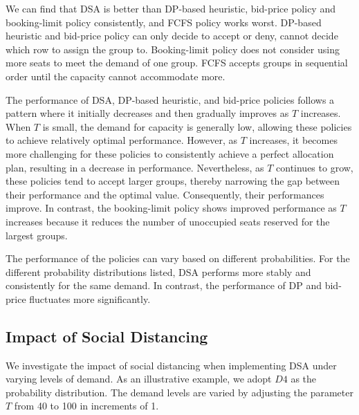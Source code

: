 We can find that DSA is better than DP-based heuristic, bid-price policy and booking-limit policy consistently, and FCFS policy works worst. DP-based heuristic and bid-price policy can only decide to accept or deny, cannot decide which row to assign the group to. Booking-limit policy does not consider using more seats to meet the demand of one group. FCFS accepts groups in sequential order until the capacity cannot accommodate more.

The performance of DSA, DP-based heuristic, and bid-price policies follows a pattern where it initially decreases and then gradually improves as $T$ increases. When $T$ is small, the demand for capacity is generally low, allowing these policies to achieve relatively optimal performance. However, as $T$ increases, it becomes more challenging for these policies to consistently achieve a perfect allocation plan, resulting in a decrease in performance. Nevertheless, as $T$ continues to grow, these policies tend to accept larger groups, thereby narrowing the gap between their performance and the optimal value. Consequently, their performances improve. In contrast, the booking-limit policy shows improved performance as $T$ increases because it reduces the number of unoccupied seats reserved for the largest groups. 

The performance of the policies can vary based on different probabilities. For the different probability distributions listed, DSA performs more stably and consistently for the same demand. In contrast, the performance of DP and bid-price fluctuates more significantly.


\subsection{Impact of Social Distancing}\label{impact_sd}
We investigate the impact of social distancing when implementing DSA under varying levels of demand. 
As an illustrative example, we adopt $D4$ as the probability distribution. The demand levels are varied by adjusting the parameter $T$ from 40 to 100 in increments of 1.

